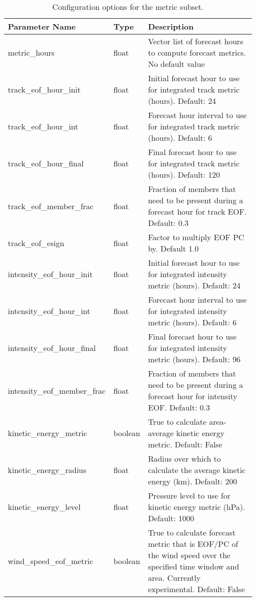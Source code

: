\documentclass[psfig,12pt]{article}
\begin{document}
\begin{table}[H]
\caption{Configuration options for the metric subset.}
\begin{center}
\begin{tabular}{|p{1.75in}|p{0.5in}|p{4.00in}|}
\hline
Parameter Name & Type & Description \\ \hline \hline
metric\_hours & float & Vector list of forecast hours to compute forecast metrics.  No default value \\ \hline
track\_eof\_hour\_init & float & Initial forecast hour to use for integrated track metric (hours).  Default: 24 \\ \hline
track\_eof\_hour\_int & float & Forecast hour interval to use for integrated track metric (hours).  Default:  6 \\ \hline
track\_eof\_hour\_final & float & Final forecast hour to use for integrated track metric (hours).  Default: 120 \\ \hline
track\_eof\_member\_frac & float & Fraction of members that need to be present during a forecast hour for track EOF.  Default:  0.3 \\ \hline
track\_eof\_esign & float & Factor to multiply EOF PC by.  Default 1.0 \\ \hline
intensity\_eof\_hour\_init & float & Initial forecast hour to use for integrated intensity metric (hours).  Default: 24 \\ \hline
intensity\_eof\_hour\_int & float & Forecast hour interval to use for integrated intensity metric (hours).  Default:  6 \\ \hline
intensity\_eof\_hour\_final & float & Final forecast hour to use for integrated intensity metric (hours).  Default: 96 \\ \hline
intensity\_eof\_member\_frac & float & Fraction of members that need to be present during a forecast hour for intensity EOF.  Default:  0.3 \\ \hline
kinetic\_energy\_metric & boolean & True to calculate area-average kinetic energy metric.  Default:  False \\ \hline
kinetic\_energy\_radius & float & Radius over which to calculate the average kinetic energy (km).  Default:  200 \\ \hline
kinetic\_energy\_level & float & Pressure level to use for kinetic energy metric (hPa).  Default: 1000 \\ \hline
wind\_speed\_eof\_metric & boolean & True to calculate forecast metric that is EOF/PC of the
wind speed over the specified time window and area.  Currently experimental.  Default:  False \\ \hline

\end{tabular}
\end{center}
\end{table}
\end{document}
